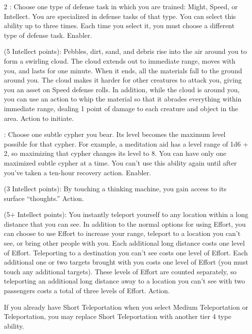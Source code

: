 \begin{multicols}{2}
: Choose one type of defense task in which you are trained: Might, Speed, or Intellect. You are specialized in defense tasks of that type. You can select this ability up to three times. Each time you select it, you must choose a different type of defense task. Enabler. 
 
 (5 Intellect points): Pebbles, dirt, sand, and debris rise into the air around you to form a swirling cloud. The cloud extends out to immediate range, moves with you, and lasts for one minute. When it ends, all the materials fall to the ground around you. The cloud makes it harder for other creatures to attack you, giving you an asset on Speed defense rolls. In addition, while the cloud is around you, you can use an action to whip the material so that it abrades everything within immediate range, dealing 1 point of damage to each creature and object in the area. Action to initiate. 

: Choose one subtle cypher you bear. Its level becomes the maximum level possible for that cypher. For example, a meditation aid has a level range of 1d6 + 2, so maximizing that cypher changes its level to 8. You can have only one maximized subtle cypher at a time. You can’t use this ability again until after you’ve taken a ten-hour recovery action. Enabler.
 
 (3 Intellect points): By touching a thinking machine, you gain access to its surface “thoughts.” Action. 
 
 (5+ Intellect points): You instantly teleport yourself to any location within a long distance that you can see. In addition to the normal options for using Effort, you can choose to use Effort to increase your range, teleport to a location you can’t see, or bring other people with you. Each additional long distance costs one level of Effort. Teleporting to
a destination you can’t see costs one level of Effort. Each additional one or two targets brought with you costs one level of Effort (you must touch any additional targets). These levels of Effort are counted separately, so teleporting an additional long distance away to a location you can’t see with two passengers costs a total of three levels of Effort. Action.

If you already have Short Teleportation when you select Medium Teleportation or Teleportation, you may replace Short Teleportation with another tier 4 type ability.


\end{multicols}
